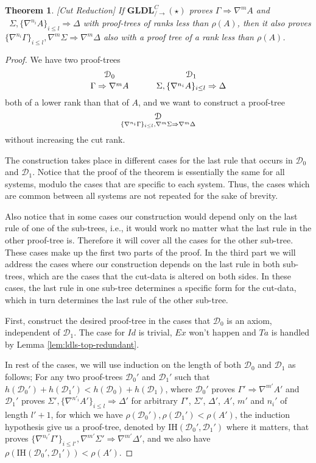 \documentclass[12pt,a4paper]{article}
\theoremstyle{plain}
\newtheorem{thm}{Theorem}[section]
\theoremstyle{definition}
\begin{document}
\begin{thm}\label{thm:ldls-cut-reduction}[Cut Reduction]
If $\mathbf{GLDL}^C_{/\rightarrow}(\star)$ proves $\Gamma \Rightarrow \nabla^m A$ and\\\ $\Sigma , \{\nabla^{n_i} A\}_{i \leq l} \Rightarrow \Delta$ with proof-trees of ranks less than $\rho(A)$, then it also proves $\{\nabla^{n_i} \Gamma\}_{i \leq l} , \nabla^m\Sigma \Rightarrow \nabla^m\Delta$ also with a proof tree of a rank less than $\rho(A)$.
\end{thm}
\begin{proof}
	We have two proof-trees
  \[
    {\mathcal{D}_0
    \atop
    \Gamma \Rightarrow \nabla^m A}
    \hspace{3em}
    {\mathcal{D}_1
    \atop
    \Sigma , \{\nabla^{n_i} A\}_{i \leq l} \Rightarrow \Delta}
  \]
  both of a lower rank than that of $A$, and we want to construct a proof-tree
  \[\mathcal{D} \atop \{\nabla^{n_i} \Gamma\}_{i \leq l} , \nabla^m \Sigma \Rightarrow \nabla^m \Delta \]
  without increasing the cut rank.

	The construction takes place in different cases for the last rule that occurs in $\mathcal{D}_0$ and $\mathcal{D}_1$. Notice that the proof of the theorem is essentially the same for all systems, modulo the cases that are specific to each system. Thus, the cases which are common between all systems are not repeated for the sake of brevity.

	Also notice that in some cases our construction would depend only on the last rule of one of the sub-trees, i.e., it would work no matter what the last rule in the other proof-tree is. Therefore it will cover all the cases for the other sub-tree. These cases make up the first two parts of the proof. In the third part we will address the cases where our construction depends on the last rule in both sub-trees, which are the cases that the cut-data is altered on both sides. In these cases, the last rule in one sub-tree determines a specific form for the cut-data, which in turn determines the last rule of the other sub-tree.


	First, construct the desired proof-tree in the cases that $\mathcal{D}_0$ is an axiom, independent of $\mathcal{D}_1$. The case for $Id$ is trivial, $Ex$ won't happen and $Ta$ is handled by Lemma \ref{lem:ldls-top-redundant}.

  In rest of the cases, we will use induction on the length of both $\mathcal{D}_0$ and $\mathcal{D}_1$ as follows; For any two proof-trees $\mathcal{D}_0'$ and $\mathcal{D}_1'$ such that $h(\mathcal{D}_0') + h(\mathcal{D}_1') < h(\mathcal{D}_0) + h(\mathcal{D}_1)$, where $\mathcal{D}_0'$ proves $\Gamma' \Rightarrow \nabla^{m'} A'$ and $\mathcal{D}_1'$ proves $\Sigma', \{\nabla^{n'_i} A'\}_{i \leq l} \Rightarrow \Delta'$ for arbitrary $\Gamma'$, $\Sigma'$, $\Delta'$, $A'$, $m'$ and $n_i'$ of length $l'+1$, for which we have $\rho(\mathcal{D}_0'),\rho(\mathcal{D}_1') < \rho(A')$, the induction hypothesis give us a proof-tree, denoted by $\text{IH}(\mathcal{D}_0', \mathcal{D}_1')$ where it matters, that proves $\{\nabla^{n_i'}\Gamma'\}_{i \leq l'}, \nabla^{m'} \Sigma' \Rightarrow \nabla^{m'} \Delta'$, and we also have $\rho(\text{IH}(\mathcal{D}_0', \mathcal{D}_1')) < \rho(A')$.



\end{proof}
\end{document}
